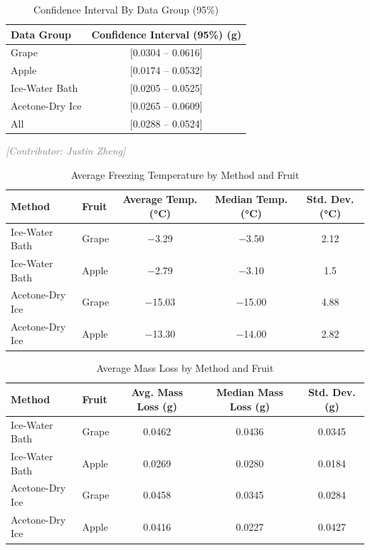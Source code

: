 \documentclass[12pt, a4paper]{article}
\newcommand{\contributor}[1]{\vspace{4pt}\noindent\textcolor{gray}{\small\textit{[Contributor: #1]}}\vspace{2pt}}
\begin{document}
\begin{table}[h]
\centering
\caption{Confidence Interval By Data Group (95\%)}
\label{tab:ci_group}
\begin{tabular}{lc}
\toprule
Data Group & Confidence Interval (95\%) (g) \\
\midrule
Grape          & [0.0304 -- 0.0616] \\
Apple          & [0.0174 -- 0.0532] \\
Ice-Water Bath & [0.0205 -- 0.0525] \\
Acetone-Dry Ice & [0.0265 -- 0.0609] \\
All            & [0.0288 -- 0.0524] \\
\bottomrule
\end{tabular}
\end{table}


\contributor{Justin Zheng}

\begin{table}[h]
\centering
\caption{Average Freezing Temperature by Method and Fruit}
\label{tab:temp}
\begin{tabular}{llccc}
\toprule
Method & Fruit & Average Temp. (°C) & Median Temp. (°C) & Std. Dev. (°C) \\
\midrule
Ice-Water Bath   & Grape & $-$3.29  & $-$3.50  & 2.12 \\
Ice-Water Bath   & Apple & $-$2.79  & $-$3.10  & 1.5  \\
Acetone-Dry Ice  & Grape & $-$15.03 & $-$15.00 & 4.88 \\
Acetone-Dry Ice  & Apple & $-$13.30 & $-$14.00 & 2.82 \\
\bottomrule
\end{tabular}
\end{table}

\begin{table}[h]
\centering
\caption{Average Mass Loss by Method and Fruit}
\label{tab:mass}
\begin{tabular}{llccc}
\toprule
Method & Fruit & Avg. Mass Loss (g) & Median Mass Loss (g) & Std. Dev. (g) \\
\midrule
Ice-Water Bath   & Grape & 0.0462 & 0.0436 & 0.0345 \\
Ice-Water Bath   & Apple & 0.0269 & 0.0280 & 0.0184 \\
Acetone-Dry Ice  & Grape & 0.0458 & 0.0345 & 0.0284 \\
Acetone-Dry Ice  & Apple & 0.0416 & 0.0227 & 0.0427 \\
\bottomrule
\end{tabular}
\end{table}
\end{document}
